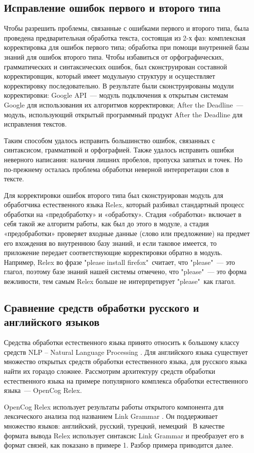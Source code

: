  
\subsection{Исправление ошибок первого и второго типа} \label{sect2_2}
Чтобы разрешить проблемы, связанные с ошибками первого и второго типа, была проведена предварительная обработка текста, состоящая из 2-х фаз: комплексная корректировка для ошибок первого типа; обработка при помощи внутренней базы знаний для ошибок второго типа. 
Чтобы избавиться от орфографических, грамматических и синтаксических ошибок, был сконструирован составной корректировщик, который имеет модульную структуру и осуществляет корректировку последовательно. В результате были сконструированы модули корректировки: Google API~--- модуль подключения к открытым системам Google для использования их алгоритмов корректировки; After the Deadline~--- модуль, использующий открытый программный продукт After the Deadline для исправления текстов. 

Таким способом удалось исправить большинство ошибок, связанных с синтаксисом, грамматикой и орфографией. Также удалось исправить ошибки неверного написания: наличия лишних пробелов, пропуска запятых и точек. Но по-прежнему осталась проблема обработки неверной интерпретации слов в тексте. \par

Для корректировки ошибок второго типа был сконструирован модуль для обработчика естественного языка Relex, который разбивал стандартный процесс обработки на «предобработку» и «обработку». Стадия «обработки» включает в себя такой же алгоритм работы, как был до этого в модуле, а стадия «предобработки» проверяет входные данные (слово или предложение) на предмет его вхождения во внутреннюю базу знаний, и если таковое имеется, то приложение передает соответствующие корректировки обратно в модуль. Например, Relex во фразе "please install firefox"\ считает, что "please"\ --- это глагол, поэтому базе знаний нашей системы отмечено, что "please"\ --- это форма вежливости, тем самым Relex больше не интерпретирует "please"\ как глагол.

\clearpage
\subsection{Сравнение средств обработки русского и английского языков} \label{sect2_3}
Средства обработки естественного языка принято относить к большому классу средств NLP – Natural Language Processing \cite{NLP}. Для английского языка существует множество открытых средств обработки естественного языка, для русского языка найти их гораздо сложнее. Рассмотрим архитектуру средств обработки естественного языка на примере популярного комплекса обработки естественного языка~--- OpenCog Relex. \par
OpenCog Relex использует результаты работы открытого компонента для лексического анализа под названием Link Grammar \cite{linkgrammar}. Он поддерживает множество языков: английский, русский, турецкий, немецкий \etc\  В качестве формата вывода Relex использует синтаксис Link Grammar и преобразует его в формат связей, как показано в примере 1. Разбор примера приводится далее. 

